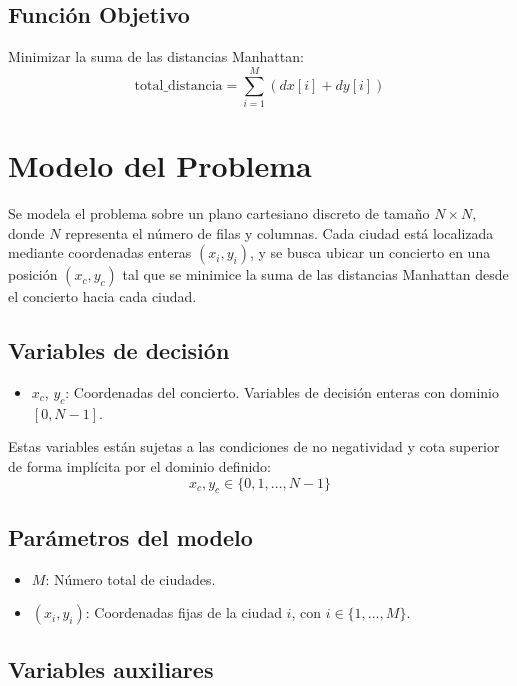 \documentclass[conference]{IEEEtran}
\begin{document}
\subsection{Función Objetivo}
Minimizar la suma de las distancias Manhattan:
\begin{equation}
	\text{total\_distancia} = \sum_{i=1}^{M} (dx[i] + dy[i])
\end{equation}

\section{Modelo del Problema}

Se modela el problema sobre un plano cartesiano discreto de tamaño $N \times N$, donde $N$ representa el número de filas y columnas. Cada ciudad está localizada mediante coordenadas enteras $(x_i, y_i)$, y se busca ubicar un concierto en una posición $(x_c, y_c)$ tal que se minimice la suma de las distancias Manhattan desde el concierto hacia cada ciudad.

\subsection*{Variables de decisión}

\begin{itemize}
    \item $x_c$, $y_c$: Coordenadas del concierto. Variables de decisión enteras con dominio $[0, N-1]$.
\end{itemize}

Estas variables están sujetas a las condiciones de no negatividad y cota superior de forma implícita por el dominio definido:
\[
x_c, y_c \in \{0, 1, \dots, N-1\}
\]

\subsection*{Parámetros del modelo}

\begin{itemize}
    \item $M$: Número total de ciudades.
    \item $(x_i, y_i)$: Coordenadas fijas de la ciudad $i$, con $i \in \{1, \dots, M\}$.
\end{itemize}

\subsection*{Variables auxiliares}
\end{document}
